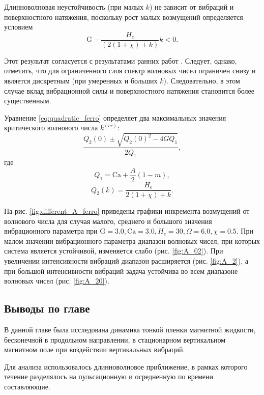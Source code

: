 \documentclass[12pt,a4paper]{article}
\begin{document}
Длинноволновая неустойчивость (при малых $k$) не зависит от вибраций и поверхностного натяжения, поскольку рост малых возмущений определяется условием
\begin{equation}
	\mathrm{G} - \frac{H_{e}}{(2(1+\chi)+k)} k<0.
\end{equation}

Этот результат согласуется с результатами ранних работ \cite{Korovin2013, Mller1998}. Следует, однако, отметить, что для ограниченного слоя спектр волновых чисел ограничен снизу и является дискретным (при умеренных и больших $k$). Следовательно, в этом случае вклад вибрационной силы и поверхностного натяжения становится более существенным.

Уравнение \eqref{eq:quadratic_ferro} определяет два максимальных значения критического волнового числа $k^{(cr)}$:
\begin{equation}
	\frac{Q_{2}(0)\pm\sqrt{Q_{2}(0)^{2}-4GQ_{1}}}{2Q_{1}},
\end{equation}
где
\begin{equation}
	Q_{1}= \mathrm{Ca}+ \frac{A}{2} (1-m) ,
\end{equation}
\begin{equation}
	Q_{2}(k)=\frac{H_{e}}{2(1+\chi)+k}.
\end{equation}

На рис. \ref{fig:different_A_ferro} приведены графики инкремента возмущений от волнового числа для случая малого, среднего и большого значения вибрационного параметра при $\mathrm{G}=3.0, \mathrm{Ca}=3.0, H_{e}=30, \Omega=6.0, \chi=0.5$.  При малом значении вибрационного параметра  диапазон волновых чисел, при которых система является устойчивой, изменяется слабо (рис. \ref{fig:A_02}). При увеличении интенсивности вибраций диапазон расширяется (рис. \ref{fig:A_2}), а при большой интенсивности вибраций задача устойчива во всем диапазоне волновых чисел (рис. \ref{fig:A_20}). 


\subsection{Выводы по главе}

В данной главе была исследована динамика тонкой пленки магнитной жидкости, бесконечной в продольном направлении, в стационарном вертикальном магнитном поле при воздействии вертикальных вибраций. 

Для анализа использовалось длинноволновое приближение, в рамках которого течение разделялось на пульсационную и осредненную по времени составляющие. 
\end{document}
